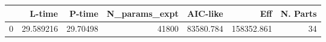 \begin{tabular}{lrrrrrr}
\toprule
{} &     L-time &    P-time &  N\_params\_expt &   AIC-like &         Eff &  N. Parts \\
\midrule
0 &  29.589216 &  29.70498 &          41800 &  83580.784 &  158352.861 &        34 \\
\bottomrule
\end{tabular}
